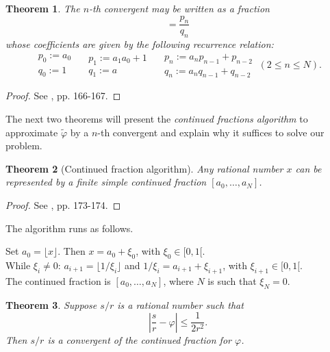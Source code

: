 \documentclass[a4paper, 10pt]{article}
\newtheorem{theorem}{Theorem }[section]
\numberwithin{equation}{section}
\numberwithin{figure}{section}
\numberwithin{table}{section}
\begin{document}
\begin{theorem}
	The $n$-th convergent may be written as a fraction
	\begin{equation}
		[a_0,\dots,a_n]=\frac{p_n}{q_n}
	\end{equation}
	whose coefficients are given by the following recurrence relation:
	$$
	\begin{array}{ll}
		p_0:=a_0\\
		q_0:=1
	\end{array}\quad
	\begin{array}{ll}
		p_1:=a_1a_0+1\\
		q_1:=a
	\end{array}\quad
	\begin{array}{ll}
		p_n:=a_np_{n-1}+p_{n-2}\\
		q_n:=a_nq_{n-1}+q_{n-2}
	\end{array}\ (2\le n \le N).
	$$
\end{theorem}

\begin{proof}
	See \cite{hardy}, pp. 166-167.
\end{proof}

The next two theorems will present the \textit{continued fractions algorithm} to approximate $\tilde{\varphi}$ by a $n$-th convergent and explain why it suffices to solve our problem.

\begin{theorem}[Continued fraction algorithm]
	Any rational number $x$ can be represented by a finite simple continued fraction $[a_0,\dots,a_N]$.\\
\end{theorem}

\begin{proof}
	See \cite{hardy}, pp. 173-174.
\end{proof}

The algorithm runs as follows.

\begin{algorithm}[h!]
	\caption{Continued fraction algorithm for rational $x$.}
	Set $a_0 = \lfloor x \rfloor$. Then $x=a_0+\xi_0$, with $\xi_0\in[0,1[$.\\
	While $\xi_i \neq 0$: $a_{i+1}=\lfloor1/\xi_{i}\rfloor$ and $1/\xi_{i}=a_{i+1}+\xi_{i+1}$, with $\xi_{i+1}\in[0,1[$.\\
	The continued fraction is $[a_0,\dots,a_N]$, where $N$ is such that $\xi_N=0$.
\end{algorithm}

\begin{theorem}
	Suppose $s/r$ is a rational number such that
	\begin{equation}
		\left|\frac{s}{r}-\varphi\right| \le \frac{1}{2r^2}.
	\end{equation}
	Then $s/r$ is a convergent of the continued fraction for $\varphi$.
\end{theorem}
\end{document}
